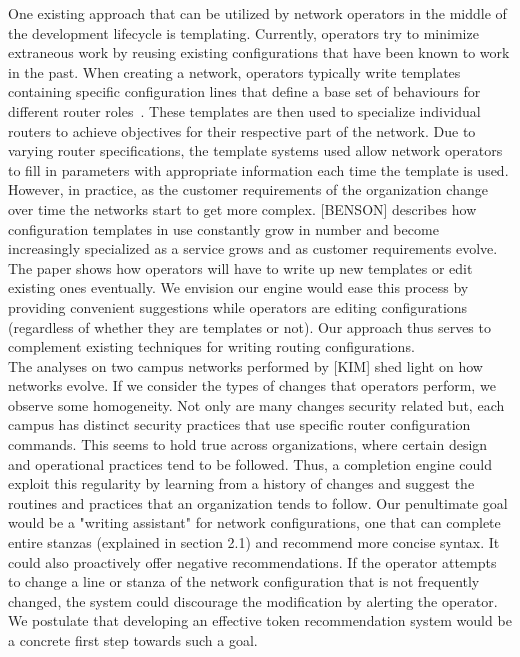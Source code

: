 One existing approach that can be utilized by network operators in the middle of the development lifecycle is templating. Currently, operators try to minimize extraneous work by reusing existing configurations that have been known to work in the past. When creating a network, operators typically write templates containing specific configuration lines that define a base set of behaviours for different router roles~\cite{complexity}. These templates are then used to specialize individual routers to achieve objectives for their respective part of the network. Due to varying router specifications, the template systems used allow network operators to fill in parameters with appropriate information each time the template is used. However, in practice, as the customer requirements of the organization change over time the networks start to get more complex. [BENSON] describes how configuration templates in use constantly grow in number and become increasingly specialized as a service grows and as customer requirements evolve. The paper shows how operators will have to write up new templates or edit existing ones eventually. We envision our engine would ease this process by providing convenient suggestions while operators are editing configurations (regardless of whether they are templates or not).
Our approach thus serves to complement existing techniques for writing routing configurations.\\ 

The analyses on two campus networks performed by [KIM] shed light on how networks evolve. If we consider the types of changes that operators perform, we observe some homogeneity. Not only are many changes security related but, each campus has distinct security practices that use specific router configuration commands. This seems to hold true across organizations, where certain design and operational practices tend to be followed. Thus, a completion engine could exploit this regularity by learning from a history of changes and suggest the routines and practices that an organization tends to follow. Our penultimate goal would be a "writing assistant" for network configurations, one that can complete entire stanzas (explained in section 2.1) and recommend more concise syntax. It could also proactively offer negative recommendations. If the operator attempts to change a line or stanza of the network configuration that is not frequently changed, the system could discourage the modification by alerting the operator. We postulate that developing an effective token recommendation system would be a concrete first step towards such a goal.\\


